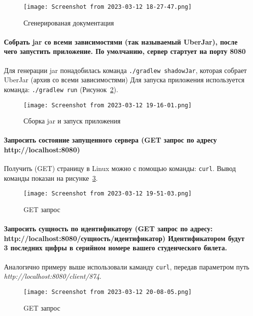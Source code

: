 \begin{figure}[h!tp]
	\centering
	\texttt{[image: Screenshot from 2023-03-12 18-27-47.png]}
	\caption{Сгенерированая документация}
	\label{fig:gradle:javadoc}
\end{figure}

\paragraph{Собрать jar со всеми зависимостями (так называемый UberJar),
после чего запустить приложение. По умолчанию,
сервер стартует на порту 8080}\mbox{}\par
Для генерации jar понадобилась команда \texttt{./gradlew shadowJar},
которая собрает UberJar (архив со всеми зависимостями)
Для запуска приложения используется команда: \texttt{./gradlew run}
(Рисунок~\ref{fig:gradle:run}).

\begin{figure}[h!tp]
	\centering
	\texttt{[image: Screenshot from 2023-03-12 19-16-01.png]}
	\caption{Сборка jar и запуск приложения}
	\label{fig:gradle:run}
\end{figure}

\paragraph{Запросить состояние запущенного сервера
(GET запрос по адресу http://localhost:8080)}\mbox{}\par
Получить (GET) страницу в Linux можно с помощью команды: \texttt{curl}.
Вывод команды показан на рисунке~\ref{fig:curl}.

\begin{figure}[h!tp]
	\centering
	\texttt{[image: Screenshot from 2023-03-12 19-51-03.png]}
	\caption{GET запрос}
	\label{fig:curl}
\end{figure}

\paragraph{Запросить сущность по идентификатору
(GET запрос по адресу: http://localhost:8080/сущность/идентификатор)
Идентификатором будут 3 последних цифры в серийном номере вашего
студенческого билета.}\mbox{}\par
Аналогично примеру выше использовали каманду \texttt{curl},
передав параметром путь \textit{http://localhost:8080/client/874}.

\begin{figure}[h!tp]
	\centering
	\texttt{[image: Screenshot from 2023-03-12 20-08-05.png]}
	\caption{GET запрос}
	\label{fig:curl:d}
\end{figure}

